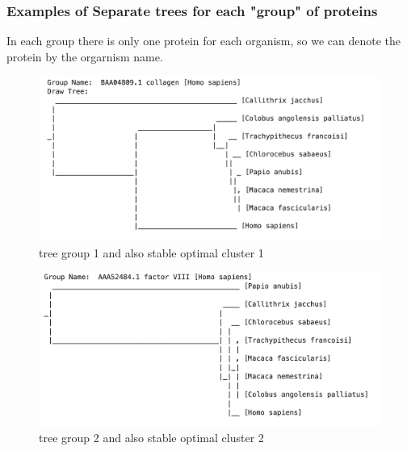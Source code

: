 \documentclass[a4paper, 12pt, one column]{article}
\begin{document}
\subsubsection{Examples of Separate trees for each "group" of proteins}
In each group there is only one protein for each organism, so we can denote the protein by the orgarnism name.\\
\begin{figure}[H]
    \centering
    \includegraphics[width=.8\linewidth]{tree_group0.png}
    \caption{tree group 1 and also stable optimal cluster 1}
    \label{fig:tree_group0.png}
\end{figure}
\begin{figure}[H]
    \centering
    \includegraphics[width=.8\linewidth]{tree_group1.png}
    \caption{tree group 2 and also stable optimal cluster 2}
    \label{fig:tree_group1.png}
\end{figure}   
\end{document}
